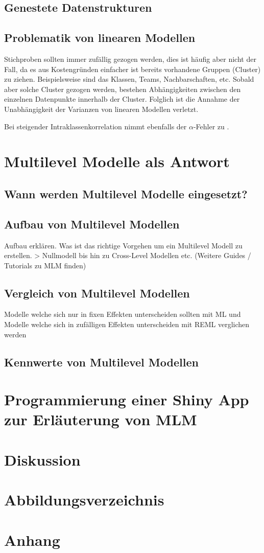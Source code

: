 \documentclass[12pt]{article}\usepackage[]{graphicx}\usepackage[]{color}
\begin{document}
\subsection{Genestete Datenstrukturen}
\subsection{Problematik von linearen Modellen}
Stichproben sollten immer zufällig gezogen werden, dies ist häufig aber nicht der Fall, da es aus Kostengründen einfacher ist bereits vorhandene Gruppen (Cluster) zu ziehen. Beispielsweise sind das Klassen, Teams, Nachbarschaften, etc. Sobald aber solche Cluster gezogen werden, bestehen Abhängigkeiten zwischen den einzelnen Datenpunkte innerhalb der Cluster. Folglich ist die Annahme der Unabhängigkeit der Varianzen von linearen Modellen verletzt.

Bei steigender Intraklassenkorrelation nimmt ebenfalls der $\alpha$-Fehler zu \cite{dorman2008effect}.

\section{Multilevel Modelle als Antwort}
\subsection{Wann werden Multilevel Modelle eingesetzt?}
\subsection{Aufbau von Multilevel Modellen}
Aufbau erklären. Was ist das richtige Vorgehen um ein Multilevel Modell zu erstellen. > Nullmodell bis hin zu Cross-Level Modellen etc. \cite{SnijdersTomA.B2012Ma:a} (Weitere Guides / Tutorials zu MLM finden)

\subsection{Vergleich von Multilevel Modellen}
Modelle welche sich nur in fixen Effekten unterscheiden sollten mit ML und Modelle welche sich in zufälligen Effekten unterscheiden mit REML verglichen werden \cite{SnijdersTomA.B2012Ma:a}

\subsection{Kennwerte von Multilevel Modellen}
\section{Programmierung einer Shiny App zur Erläuterung von MLM}
\section{Diskussion}
\newpage



\section{Abbildungsverzeichnis}
\section{Anhang}
\end{document}
